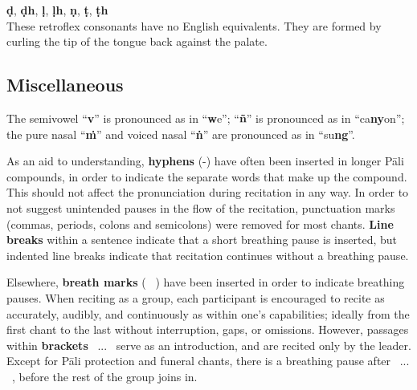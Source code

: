 \begin{justify}
  \textbf{ḍ}, \textbf{ḍh}, \textbf{ḷ}, \textbf{ḷh}, \textbf{ṇ}, \textbf{ṭ}, \textbf{ṭh}\\
  These retroflex consonants have no English equivalents. They are formed by curling the tip of the tongue back against the palate.
\end{justify}

\clearpage

\subsection*{Miscellaneous}
\begin{justify}
  The semivowel ``\textbf{v}'' is pronounced as in ``\textbf{w}e''; ``\textbf{ñ}'' is pronounced as in ``ca\textbf{ny}on''; the pure nasal ``\textbf{ṁ}'' and voiced nasal ``\textbf{ṅ}'' are pronounced as in ``su\textbf{ng}''.
\end{justify}

\begin{justify}
  As an aid to understanding, \textbf{hyphens} (-) have often been inserted in longer Pāli compounds, in order to indicate the separate words that make up the compound. This should not affect the pronunciation during recitation in any way. In order to not suggest unintended pauses in the flow of the recitation, punctuation marks (commas, periods, colons and semicolons) were removed for most chants. \textbf{Line breaks} within a sentence indicate that a short breathing pause is inserted, but indented line breaks indicate that recitation continues without a breathing pause.
\end{justify}

\begin{justify}
  Elsewhere, \textbf{breath marks} ( \abbrbreathmark\ ) have been inserted in order to indicate breathing pauses. When reciting as a group, each participant is encouraged to recite as accurately, audibly, and continuously as within one's capabilities; ideally from the first chant to the last without interruption, gaps, or omissions. However, passages within \textbf{brackets} \anglebracketleft\ \hspace{-0.5mm}... \hspace{-0.8mm}\anglebracketright\ serve as an introduction, and are recited only by the leader. Except for Pāli protection and funeral chants, there is a breathing pause after \anglebracketleft\ \hspace{-0.5mm}... \hspace{-0.8mm}\anglebracketright\ , before the rest of the group joins in.
\end{justify}

\clearpage

